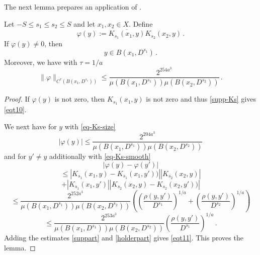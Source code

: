 The next lemma prepares an application of
.
\begin{lemma}\label{correlation-kernel-bound}
\leanok
{}
Let $-S\le s_1\le s_2\le S$ and let $x_1,x_2\in X$.
Define \begin{equation}
 \varphi(y) := \overline{K_{s_1}(x_1, y)}
 K_{s_2}(x_2, y) \, .
\end{equation}
If $\varphi(y)\neq 0$, then
\begin{equation}\label{eqt10}
    y\in B(x_1, D^{s_1})\, .
\end{equation}
Moreover, we have with $\tau = 1/a$
\begin{equation}\label{eqt11}
  \|\varphi\|_{C^\tau(B(x_1, D^{s_1}))}\le
\frac{2^{254 a^3}}{\mu(B(x_1, D^{s_1}))\mu(B(x_2, D^{s_2}))}
      \, .
\end{equation}

\end{lemma}
\begin{proof}
\leanok

If $\varphi(y)$ is not zero, then $K_{s_1}(x_1, y)$ is not zero and thus
\eqref{supp-Ks} gives \eqref{eqt10}.

We next have for $y$ with \eqref{eq-Ks-size}
\begin{equation}\label{suppart}
    |\varphi(y)|\le
    \frac{2^{204 a^3}}{\mu(B(x_1, D^{s_1}))\mu(B(x_2, D^{s_2}))}
\end{equation}
and for $y'\neq y$ additionally with \eqref{eq-Ks-smooth}
\begin{equation}
    |\varphi(y)-\varphi(y')|
 \end{equation}
 \begin{equation}
 \le
 |K_{s_1}(x_1,y)-K_{s_1}(x_1,y'))||
 K_{s_2}(x_2, y)|
\end{equation}
 \begin{equation}+|K_{s_1}(x_1, y')|
 |K_{s_2}(x_2, y) - K_{s_2}(x_2, y'))|
\end{equation}
\begin{equation}
      \le \frac{2^{252 a^3}}{\mu(B(x_1, D^{s_1}))\mu(B(x_2, D^{s_2}))}
       \left(\left(\frac{ \rho(y,y')}{D^{s_1}}\right)^{1/a}+
       \left(\frac{ \rho(y,y')}{D^{s_2}}\right)^{1/a}\right)
\end{equation}
\begin{equation}\label{holderpart}
      \le \frac{2^{253 a^3}}{\mu(B(x_1, D^{s_1}))\mu(B(x_2, D^{s_2}))}
       \left(\frac{ \rho(y,y')}{D^{s_1}}\right)^{1/a}\,.
\end{equation}
Adding the estimates \eqref{suppart} and \eqref{holderpart} gives \eqref{eqt11}.
This proves the lemma.
\end{proof}

